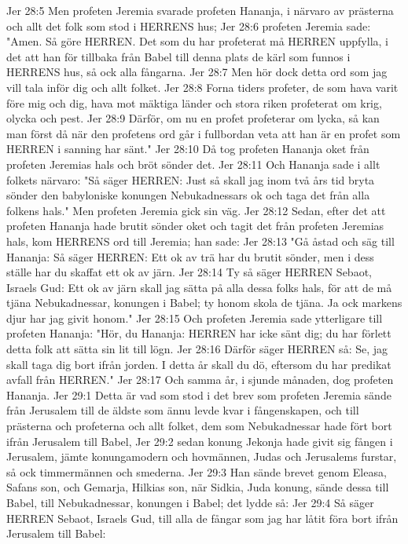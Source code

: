 Jer 28:5  Men profeten Jeremia svarade profeten Hananja, i närvaro av prästerna och allt det folk som stod i HERRENS hus;
Jer 28:6  profeten Jeremia sade: "Amen. Så göre HERREN. Det som du har profeterat må HERREN uppfylla, i det att han för tillbaka från Babel till denna plats de kärl som funnos i HERRENS hus, så ock alla fångarna.
Jer 28:7  Men hör dock detta ord som jag vill tala inför dig och allt folket.
Jer 28:8  Forna tiders profeter, de som hava varit före mig och dig, hava mot mäktiga länder och stora riken profeterat om krig, olycka och pest.
Jer 28:9  Därför, om nu en profet profeterar om lycka, så kan man först då när den profetens ord går i fullbordan veta att han är en profet som HERREN i sanning har sänt."
Jer 28:10  Då tog profeten Hananja oket från profeten Jeremias hals och bröt sönder det.
Jer 28:11  Och Hananja sade i allt folkets närvaro: "Så säger HERREN: Just så skall jag inom två års tid bryta sönder den babyloniske konungen Nebukadnessars ok och taga det från alla folkens hals." Men profeten Jeremia gick sin väg.
Jer 28:12  Sedan, efter det att profeten Hananja hade brutit sönder oket och tagit det från profeten Jeremias hals, kom HERRENS ord till Jeremia; han sade:
Jer 28:13  "Gå åstad och säg till Hananja: Så säger HERREN: Ett ok av trä har du brutit sönder, men i dess ställe har du skaffat ett ok av järn.
Jer 28:14  Ty så säger HERREN Sebaot, Israels Gud: Ett ok av järn skall jag sätta på alla dessa folks hals, för att de må tjäna Nebukadnessar, konungen i Babel; ty honom skola de tjäna. Ja ock markens djur har jag givit honom."
Jer 28:15  Och profeten Jeremia sade ytterligare till profeten Hananja: "Hör, du Hananja: HERREN har icke sänt dig; du har förlett detta folk att sätta sin lit till lögn.
Jer 28:16  Därför säger HERREN så: Se, jag skall taga dig bort ifrån jorden. I detta år skall du dö, eftersom du har predikat avfall från HERREN."
Jer 28:17  Och samma år, i sjunde månaden, dog profeten Hananja.
Jer 29:1  Detta är vad som stod i det brev som profeten Jeremia sände från Jerusalem till de äldste som ännu levde kvar i fångenskapen, och till prästerna och profeterna och allt folket, dem som Nebukadnessar hade fört bort ifrån Jerusalem till Babel,
Jer 29:2  sedan konung Jekonja hade givit sig fången i Jerusalem, jämte konungamodern och hovmännen, Judas och Jerusalems furstar, så ock timmermännen och smederna.
Jer 29:3  Han sände brevet genom Eleasa, Safans son, och Gemarja, Hilkias son, när Sidkia, Juda konung, sände dessa till Babel, till Nebukadnessar, konungen i Babel; det lydde så:
Jer 29:4  Så säger HERREN Sebaot, Israels Gud, till alla de fångar som jag har låtit föra bort ifrån Jerusalem till Babel:
